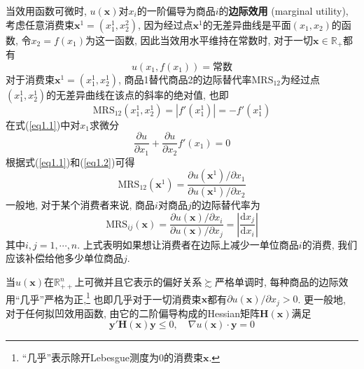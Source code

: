\documentclass[cn, 12pt, math=mtpro2, bibstyle=apa, blue]{elegantbook}
\newcommand{\R}{\mathbb{R}}
\newcommand{\x}{\mathbf{x}}
\begin{document}
当效用函数可微时, $u(\x)$对$x_i$的一阶偏导为商品$i$的\textbf{边际效用} (marginal utility), 考虑任意消费束$\x^1=(x^1_1,x^2_2)$, 因为经过点$\x^1$的无差异曲线是平面$(x_1,x_2)$的函数, 令$x_2=f(x_1)$为这一函数, 因此当效用水平维持在常数时, 对于一切$\x\in\R_+$都有
\begin{equation}\label{eq1.1}
  u(x_1,f(x_1))=\text{常数}
\end{equation}
对于消费束$\x^1=(x^1_1,x^1_2)$, 商品1替代商品2的边际替代率$\text{MRS}_{12}$为经过点$(x_1^1,x_2^1)$的无差异曲线在该点的斜率的绝对值, 也即
$$\text{MRS}_{12}(x_1^1,x_2^1)=|f'(x_1^1)|=-f'(x_1^1)$$
在式(\ref{eq1.1})中对$x_1$求微分
\begin{equation}\label{eq1.2}
  \frac{\partial u}{\partial x_1}+\frac{\partial u}{\partial x_2}f'(x_1)=0
\end{equation}
根据式(\ref{eq1.1})和(\ref{eq1.2})可得
$$\text{MRS}_{12}(\x^1)=\frac{\partial u(\x^1)/\partial x_1}{\partial u(\x^1)/\partial x_2}$$
一般地, 对于某个消费者来说, 商品$i$对商品$j$的边际替代率为
$$\text{MRS}_{ij}(\x)=\frac{\partial u(\x)/\partial x_i}{\partial u(\x)/\partial x_j}=\left|\frac{\text{d}x_j}{\text{d}x_i}\right|$$
其中$i,j=1,\cdots,n$. 上式表明如果想让消费者在边际上减少一单位商品$i$的消费, 我们应该补偿给他多少单位商品$j$. 

当$u(\x)$在$\R^n_{++}$上可微并且它表示的偏好关系$\succsim$严格单调时, 每种商品的边际效用“几乎”严格为正,\footnote{“几乎”表示除开Lebesgue测度为0的消费束$\x$.} 也即几乎对于一切消费束$\x$都有$\partial u(\x)/\partial x_j>0$. 更一般地, 对于任何拟凹效用函数, 由它的二阶偏导构成的Hessian矩阵$\mathbf{H}(\x)$满足
$$\mathbf{y}'\mathbf{H}(\x)\mathbf{y}\le0,\quad \nabla u(\x)\cdot\mathbf{y}=0$$
\end{document}
